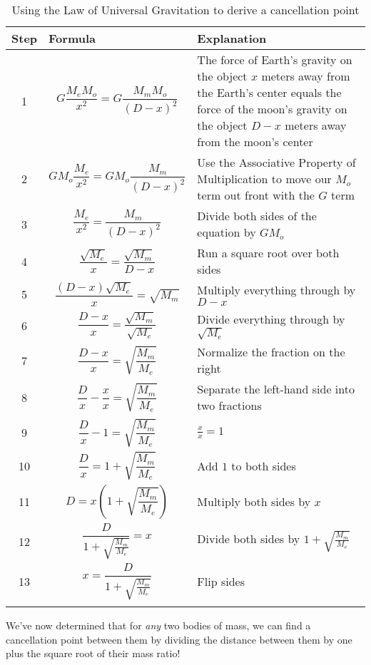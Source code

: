 \documentclass[10pt,letterpaper]{report}
\begin{document}
\begin{longtable}{| c | p{} | p{} |}
  \hline
  Step & Formula & Explanation \\
  \hline \hline
  1 & \[ G\frac{M_e M_o}{x^2} = G\frac{M_m M_o}{(D - x)^2} \] & The
    force of Earth's gravity on the object $x$ meters away from the
    Earth's center equals the force of the moon's gravity on the
    object $D - x$ meters away from the moon's center\\
    \hline
  2 & \[ GM_o \frac{M_e}{x^2} = GM_o\frac{M_m}{(D - x)^2} \] & Use the
  Associative Property of Multiplication to move our $M_o$ term out
  front with the $G$ term \\
  \hline
  3 & \[ \frac{M_e}{x^2} = \frac{M_m}{(D - x)^2} \] & Divide both
  sides of the equation by $GM_o$ \\
  \hline
  4 & \[ \frac{\sqrt{M_e}}{x} = \frac{\sqrt{M_m}}{D - x} \] & Run a
  square root over both sides \\
  \hline
  5 & \[ \frac{(D-x)\sqrt{M_e}}{x} = \sqrt{M_m} \] & Multiply
  everything through by $D - x$ \\
  \hline
  6 & \[ \frac{D-x}{x} = \frac{\sqrt{M_m}}{\sqrt{M_e}} \] & Divide
  everything through by $\sqrt{M_e}$ \\
  \hline
  7 & \[ \frac{D - x}{x} = \sqrt{\frac{M_m}{M_e}} \] & Normalize the
  fraction on the right \\
  \hline
  8 & \[ \frac{D}{x} - \frac{x}{x} = \sqrt{\frac{M_m}{M_e}} \] &
  Separate the left-hand side into two fractions \\
  \hline
  9 & \[ \frac{D}{x} - 1 = \sqrt{\frac{M_m}{M_e}} \] & $\frac{x}{x} =
  1$ \\
  \hline
  10 & \[ \frac{D}{x} = 1 + \sqrt{\frac{M_m}{M_e}} \] & Add $1$ to
  both sides \\
  \hline
  11 & \[ D = x\left( 1 + \sqrt{\frac{M_m}{M_e}}\right) \] & Multiply both sides by
  $x$ \\
  \hline
  12 & \[ \frac{D}{1 + \sqrt{\frac{M_m}{M_e}}} = x \] & Divide both
  sides by $1 + \sqrt{\frac{M_m}{M_e}}$\\
  \hline
  13 & \[ x = \frac{D}{1 + \sqrt{\frac{M_m}{M_e}}} \] & Flip sides \\
  \hline
\caption{Using the Law of Universal Gravitation to derive a cancellation
  point}
\end{longtable}

We've now determined that for \textit{any} two bodies of mass, we
can find a cancellation point between them by dividing the distance
between them by one plus the square root of their mass ratio!
\end{document}
